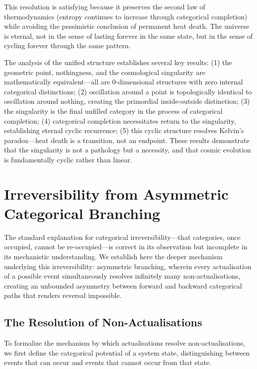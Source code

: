 \documentclass[12pt,a4paper]{article}
\theoremstyle{definition}
\theoremstyle{remark}
\begin{document}
This resolution is satisfying because it preserves the second law of thermodynamics (entropy continues to increase through categorical completion) while avoiding the pessimistic conclusion of permanent heat death. The universe is eternal, not in the sense of lasting forever in the same state, but in the sense of cycling forever through the same pattern.

The analysis of the unified structure establishes several key results: (1) the geometric point, nothingness, and the cosmological singularity are mathematically equivalent—all are 0-dimensional structures with zero internal categorical distinctions; (2) oscillation around a point is topologically identical to oscillation around nothing, creating the primordial inside-outside distinction; (3) the singularity is the final unfilled category in the process of categorical completion; (4) categorical completion necessitates return to the singularity, establishing eternal cyclic recurrence; (5) this cyclic structure resolves Kelvin's paradox—heat death is a transition, not an endpoint. These results demonstrate that the singularity is not a pathology but a necessity, and that cosmic evolution is fundamentally cyclic rather than linear.



\section{Irreversibility from Asymmetric Categorical Branching}
\label{sec:asymmetric}

The standard explanation for categorical irreversibility—that categories, once occupied, cannot be re-occupied—is correct in its observation but incomplete in its mechanistic understanding. We establish here the deeper mechanism underlying this irreversibility: asymmetric branching, wherein every actualisation of a possible event simultaneously resolves infinitely many non-actualisations, creating an unbounded asymmetry between forward and backward categorical paths that renders reversal impossible.

\subsection{The Resolution of Non-Actualisations}

To formalize the mechanism by which actualisations resolve non-actualisations, we first define the categorical potential of a system state, distinguishing between events that can occur and events that cannot occur from that state.
\end{document}
